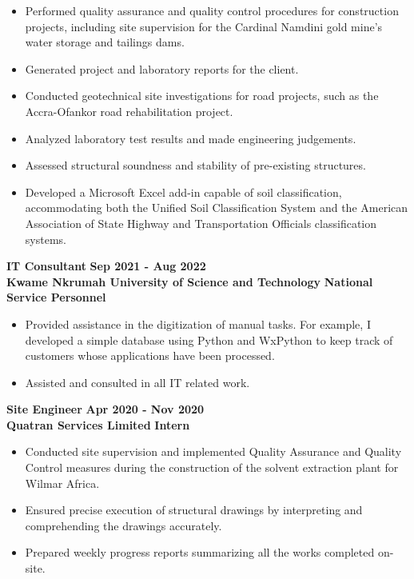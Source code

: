 \documentclass[letterpaper, 11pt]{article}
\newcommand{\verticalSpace}{4pt}
\begin{document}
\begin{itemize}[leftmargin=*]

	\item Performed quality assurance and quality control procedures for construction
     projects, including site supervision for the Cardinal Namdini gold mine's water
     storage and tailings dams.
	\item Generated project and laboratory reports for the client.
	\item Conducted geotechnical site investigations for road projects, such as the
    Accra-Ofankor road rehabilitation project.
	\item Analyzed laboratory test results and made engineering judgements.
	\item Assessed structural soundness and stability of pre-existing structures.
	\item Developed a Microsoft Excel add-in capable of soil classification,
     accommodating both the Unified Soil Classification System and the
     American Association of State Highway and Transportation Officials classification
     systems.

\end{itemize}

\textbf{IT Consultant} \hfill \textbf{Sep 2021 - Aug 2022} \\ [\verticalSpace]
\textbf{Kwame Nkrumah University of Science and Technology} \hfill \textbf{National
     Service Personnel}

\begin{itemize}[leftmargin=*]

	\item Provided assistance in the digitization of manual tasks. For example,
	      I developed a simple database using Python and WxPython to keep track of
	      customers whose applications have been processed.
	\item Assisted and consulted in all IT related work.

\end{itemize}

\textbf{Site Engineer} \hfill \textbf{Apr 2020 - Nov 2020} \\ [\verticalSpace]
\textbf{Quatran Services Limited} \hfill \textbf{Intern}

\begin{itemize}[leftmargin=*]

	\item Conducted site supervision and implemented Quality Assurance and Quality
     Control measures during the construction of the solvent extraction plant for
     Wilmar Africa.
	\item Ensured precise execution of structural drawings by interpreting and
    comprehending the drawings accurately.
	\item Prepared weekly progress reports summarizing all the works completed on-site.

\end{itemize}
\end{document}
